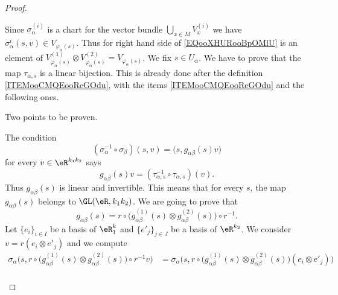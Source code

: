 \begin{proof}
\begin{subproof}
		Since \( \sigma_{\alpha}^{(i)}\) is a chart for the vector bundle \( \bigcup_{x\in M}V_x^{(i)}\) we have \( \sigma_{\alpha}^{i}(s,v)\in V_{\varphi_{\alpha}(s)}\). Thus for right hand side of \eqref{EQooXHURooBpOMlU} is an element of \( V_{\varphi_{\alpha}(s)}^{(1)}\otimes V_{\varphi_{\alpha}(s)}^{(2)}=V_{\varphi_{\alpha}(s)}\).
		We fix \( s\in U_{\alpha}\). We have to prove that the map \( \tau_{\alpha,s}\) is a linear bijection. This is already done after the definition \eqref{ITEMooCMQEooReGOdu}, with the items \ref{ITEMooCMQEooReGOdu} and the following ones.

		Two points to be proven.
		\begin{subproof}
			The condition
			\begin{equation}
				(\sigma_{\alpha}^{-1}\circ\sigma_{\beta})(s,v)=\big( s,g_{\alpha\beta}(s)v \big)
			\end{equation}
			for every \( v\in \eR^{k_1k_2}\) says
			\begin{equation}
				g_{\alpha\beta}(s)v=(\tau_{\alpha,s}^{-1}\circ\tau_{\alpha,s})(v).
			\end{equation}
			Thus \( g_{\alpha\beta}(s)\) is linear and invertible. This means that for every \( s\), the map \( g_{\alpha\beta}(s)\) belongs to \(\GL(\eR, k_1k_2)\).
			We are going to prove that
			\begin{equation}\label{EQooAUMXooCoqPTO}
				g_{\alpha\beta}(s)=r\circ\big( g_{\alpha\beta}^{(1)}(s)\otimes g_{\alpha\beta}^{(2)}(s) \big)\circ r^{-1}.
			\end{equation}
			Let \( \{ e_i \}_{i\in I}\) be a basis of \( \eR^k_1\) and \( \{ e'_j \}_{j\in J}\) be a basis of \( \eR^{k_2}\). We consider \( v=r(e_i\otimes e'_j)\) and we compute
			\begin{subequations}		\label{EQSooUIMFooMBbBvp}
				\begin{align}
					\sigma_{\alpha}\Big( s,  r\circ\big( g_{\alpha\beta}^{(1)}(s)\otimes g_{\alpha\beta}^{(2)}(s) \big)\circ r^{-1}v \Big)
					 & =\sigma_{\alpha}\Big(  s, r\circ\big( g_{\alpha\beta}^{(1)}(s)\otimes g_{\alpha\beta}^{(2)}(s) \big)(e_i\otimes e'_j)   \Big)                                                          \\

\end{align}
\end{subequations}
\end{subproof}
\end{subproof}
\end{proof}
